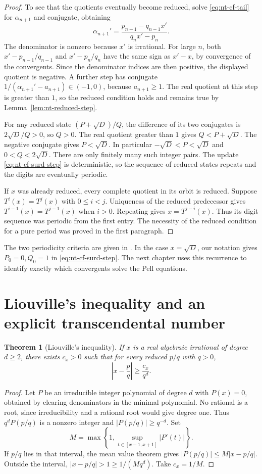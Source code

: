 \documentclass[11pt,oneside,openany]{book}
\theoremstyle{plain}
\newtheorem{theorem}{Theorem}[chapter]
\theoremstyle{definition}
\theoremstyle{remark}
\begin{document}
\begin{proof}
To see that the quotients eventually become reduced, solve
\eqref{eq:nt-cf-tail} for \(\alpha_{n+1}\) and conjugate, obtaining
\[
 \alpha_{n+1}'
   =\frac{p_{n-1}-q_{n-1}x'}{q_nx'-p_n}.
\]
The denominator is nonzero because \(x'\) is irrational.
For large \(n\), both \(x'-p_{n-1}/q_{n-1}\) and
\(x'-p_n/q_n\) have the same sign as \(x'-x\), by convergence of the
convergents. Since the denominator indices are then positive, the
displayed quotient is negative. A further step has conjugate
\(1/(\alpha_{n+1}'-a_{n+1})\in(-1,0)\), because \(a_{n+1}\ge1\).
The real quotient at this step is greater than \(1\), so the reduced
condition holds and remains true by Lemma~\ref{lem:nt-reduced-step}.

For any reduced state \((P+\sqrt D)/Q\), the difference of its two
conjugates is \(2\sqrt D/Q>0\), so \(Q>0\). The real quotient greater
than \(1\) gives \(Q<P+\sqrt D\). The negative conjugate gives
\(P<\sqrt D\). In particular \(-\sqrt D<P<\sqrt D\) and
\(0<Q<2\sqrt D\). There are only finitely many such integer pairs.
The update \eqref{eq:nt-cf-surd-step} is deterministic, so the sequence
of reduced states repeats and the digits are eventually periodic.

If \(x\) was already reduced, every complete quotient in its orbit is
reduced. Suppose \(T^i(x)=T^j(x)\) with \(0\le i<j\).
Uniqueness of the reduced predecessor gives
\(T^{i-1}(x)=T^{j-1}(x)\) when \(i>0\). Repeating gives
\(x=T^{j-i}(x)\). Thus its digit sequence was periodic from the first
entry. The necessity of the reduced condition for a pure period was
proved in the first paragraph.
\end{proof}

The two periodicity criteria are given in
\cite[\S7.7, Theorems 7.19--7.20]{nzm}. In the case \(x=\sqrt D\),
our notation gives \(P_0=0,Q_0=1\) in
\eqref{eq:nt-cf-surd-step}. The next chapter uses this recurrence to
identify exactly which convergents solve the Pell equations.

\section{Liouville's inequality and an explicit transcendental number}
\label{nt:E09}

\begin{theorem}[Liouville's inequality]
If \(x\) is a real algebraic irrational of degree \(d\ge2\), there
exists \(c_x>0\) such that for every reduced \(p/q\) with \(q>0\),
\[
 \left|x-\frac pq\right|\ge \frac{c_x}{q^d}.
\]
\end{theorem}
\begin{proof}
Let \(P\) be an irreducible integer polynomial of degree \(d\) with
\(P(x)=0\), obtained by clearing denominators in the minimal
polynomial. No rational is a root, since irreducibility and a
rational root would give degree one. Thus
\(q^dP(p/q)\) is a nonzero integer and
\(\lvert P(p/q)\rvert\ge q^{-d}\). Set
\[
 M=\max\left\{1,\sup_{t\in[x-1,x+1]}\lvert P'(t)\rvert\right\}.
\]
If \(p/q\) lies in that interval, the mean value theorem gives
\(\lvert P(p/q)\rvert\le M\lvert x-p/q\rvert\).
Outside the interval, \(\lvert x-p/q\rvert>1\ge1/(Mq^d)\).
Take \(c_x=1/M\).
\end{proof}
\end{document}
